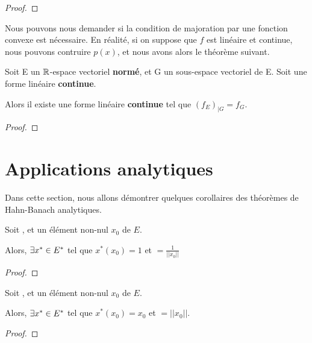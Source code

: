 \begin{proof}
	
\end{proof}

Nous pouvons nous demander si la condition de majoration par une fonction
convexe est nécessaire. En réalité, si on suppose que $f$ est linéaire et
continue, nous pouvons contruire $p(x)$, et nous avons alors le théorème
suivant.

\begin{theorem} 
	Soit E un $\mathbb{R}$-espace vectoriel \textbf{normé}, et G un sous-espace
	vectoriel de E.
	Soit  une forme linéaire
	\textbf{continue}.

	Alors il existe une forme linéaire \textbf{continue}
	 tel que $(f_{E})_{|G} = f_{G}$.
	\label{hahn-banach-analytic-2}
\end{theorem}

\begin{proof}
	
\end{proof}
\section{Applications analytiques}

Dans cette section, nous allons démontrer quelques corollaires des théorèmes de
Hahn-Banach analytiques.

\begin{corollary}
	Soit , et un élément non-nul $x_{0}$ de $E$.

	Alors, $\exists x^{*} \in E^{*}$ tel que $x^{*}(x_{0}) = 1$ et
	 $= \frac{1}{||x_{0}||}$
\end{corollary}

\begin{proof}
	
\end{proof}

\begin{corollary}
	Soit , et un élément non-nul $x_{0}$ de $E$.

	Alors, $\exists x^{*} \in E^{*}$ tel que $x^{*}(x_{0}) = x_{0}$ et
	 $= ||x_{0}||$.
\end{corollary}

\begin{proof}
	
\end{proof}

